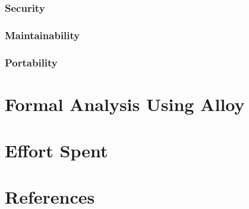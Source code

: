 \documentclass[a4paper]{article}
\begin{document}
    \subsubsection{Security}
    
    \subsubsection{Maintainability}
    
    \subsubsection{Portability}
    
    \section{Formal Analysis Using Alloy}
    
    \section{Effort Spent}
    
    \section{References}
    
    
    
\end{document}
